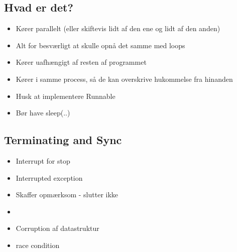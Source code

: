 \subsection{Hvad er det?} %
\label{sub:hvad_er_det_}
\begin{itemize}
    \item Kører parallelt (eller skiftevis lidt af den ene og lidt af den anden)
    \item Alt for besværligt at skulle opnå det samme med loops
    \item Kører uafhængigt af resten af programmet
    \item Kører i samme process, så de kan overskrive hukommelse fra hinanden
    \item Husk at implementere Runnable
    \item Bør have sleep(..)
\end{itemize}
\subsection{Terminating and Sync} %
\label{sub:terminating_and_sync}
\begin{itemize}
    \item Interrupt for stop
    \item Interrupted exception
    \item Skaffer opmærksom - slutter ikke
    \item
    \item Corruption af datastruktur
    \item race condition
\end{itemize}
